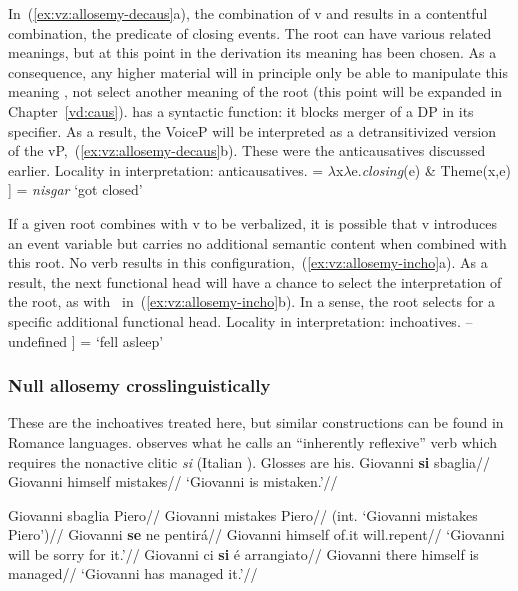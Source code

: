 In~(\ref{ex:vz:allosemy-decaus}a), the combination of v and  results in a contentful combination, the predicate of closing events. The root can have various related meanings, but at this point in the derivation its meaning has been chosen. As a consequence, any higher material will in principle only be able to manipulate this meaning \citep{arad03}, not select another meaning of the root (this point will be expanded in Chapter~\ref{vd:caus}). {\vz} has a syntactic function: it blocks merger of a DP in its specifier. As a result, the VoiceP will be interpreted as a detransitivized version of the vP,~(\ref{ex:vz:allosemy-decaus}b). These were the anticausatives discussed earlier.
\pex Locality in interpretation: anticausatives.\label{ex:vz:allosemy-decaus}
    \a {} = $\lambda$x$\lambda$e.\emph{closing}(e) \& Theme(x,e)
    \a {[} \fbox{\textbf{\vz}}  ] = \emph{nisgar} `got closed'
\xe

If a given root combines with v to be verbalized, it is possible that v introduces an event variable but carries no additional semantic content when combined with this root. No verb results in this configuration,~(\ref{ex:vz:allosemy-incho}a). As a result, the next functional head will have a chance to select the interpretation of the root, as with \vz~in~(\ref{ex:vz:allosemy-incho}b). In a sense, the root selects for a specific additional functional head.
\pex Locality in interpretation: inchoatives.\label{ex:vz:allosemy-incho}
    \a {} -- undefined
    \a {[} \fbox{\textbf{\vz}}  ] = `fell asleep'
\xe

	\subsubsection{Null allosemy crosslinguistically}
These are the inchoatives treated here, but similar constructions can be found in Romance languages. \cite{burzio86} observes what he calls an ``inherently reflexive'' verb which requires the nonactive clitic \emph{si} (Italian ). Glosses are his.
\pex
	\a \begingl
		\gla Giovanni \textbf{si} sbaglia//
		\glb Giovanni himself mistakes//
		\glft `Giovanni is mistaken.'//
	\endgl
	
	\a \ljudge{*} \begingl
		\gla Giovanni sbaglia Piero//
		\glb Giovanni mistakes Piero//
		\glft (int. `Giovanni mistakes Piero')//
	\endgl
\xe
\ex
	\begingl
		\gla Giovanni \textbf{se} ne pentir\'a//
		\glb Giovanni himself of.it will.repent//
		\glft `Giovanni will be sorry for it.'//
	\endgl
\xe
\ex
	\begingl
		\gla Giovanni ci \textbf{si} \'e arrangiato//
		\glb Giovanni there himself is managed//
		\glft `Giovanni has managed it.'//
	\endgl
\xe

